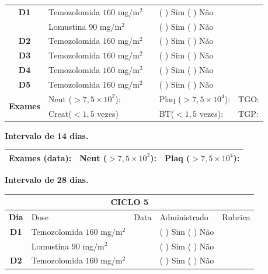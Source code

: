 \documentclass[11pt,a4paper,oldfontcommands]{memoir}
\begin{document}
\begin{center}
\begin{table}[H]
\begin{tabular}{p{1cm}p{5cm}|p{1cm}|p{4.5cm}|p{2cm}}
    \hline
    \multicolumn{1}{c|}{\multirow{1}{*}{\textbf{D1}}}&{Temozolomida \(160\) mg/m\(^2\)}&&{(  ) Sim (  ) Não}&\\
    \multicolumn{1}{c|}{\multirow{1}{*}{\textbf{}}}&{Lomustina \(90\) mg/m\(^2\)}&&{(  ) Sim (  ) Não}&\\
    \multicolumn{1}{c|}{\multirow{1}{*}{\textbf{D2}}}&{Temozolomida \(160\) mg/m\(^2\)}&&{(  ) Sim (  ) Não}&\\
    \multicolumn{1}{c|}{\multirow{1}{*}{\textbf{D3}}}&{Temozolomida \(160\) mg/m\(^2\)}&&{(  ) Sim (  ) Não}&\\
    \multicolumn{1}{c|}{\multirow{1}{*}{\textbf{D4}}}&{Temozolomida \(160\) mg/m\(^2\)}&&{(  ) Sim (  ) Não}&\\
    \multicolumn{1}{c|}{\multirow{1}{*}{\textbf{D5}}}&{Temozolomida \(160\) mg/m\(^2\)}&&{(  ) Sim (  ) Não}&\\
    \hline
    \multicolumn{1}{c|}{\multirow{2}{*}{\textbf{Exames}}}&\multicolumn{2}{l|}{Neut (\(>7,5\times10^2\)):}&{Plaq (\(>7,5\times10^4\)):}&{TGO:}\\
    \cline{2-5}
    \multicolumn{1}{c|}{\multirow{2}{*}{{}}}&\multicolumn{2}{l|}{Creat(\(<1,5\) vezes)}&{BT(\(<1,5\) vezes):}&{TGP:}
    \\
    \hline
\end{tabular}
\end{table}
\textbf{Intervalo de 14 dias.}
\begin{table}[H]
\begin{tabular}{p{5cm}|p{5cm}|p{4.7cm}}
    \hline
    \textbf{Exames (data):}&{Neut (\(>7,5\times10^2\)):}&{Plaq (\(>7,5\times10^4\)):}
    \\
    \hline
\end{tabular}
\end{table}
\textbf{Intervalo de 28 dias.}
\begin{table}[H]
\begin{tabular}{p{1cm}p{5cm}|p{1cm}|p{4.5cm}|p{2cm}}
	\hline
	\multicolumn{5}{c}{\textbf{CICLO 5}}\\
\hline
    \multicolumn{1}{c|}{\multirow{1}{*}{\textbf{Dia}}}&{Dose}&{Data}&{Administrado}&{Rubrica} \\
    \hline
    \multicolumn{1}{c|}{\multirow{1}{*}{\textbf{D1}}}&{Temozolomida \(160\) mg/m\(^2\)}&&{(  ) Sim (  ) Não}&\\
    \multicolumn{1}{c|}{\multirow{1}{*}{\textbf{}}}&{Lomustina \(90\) mg/m\(^2\)}&&{(  ) Sim (  ) Não}&\\
    \multicolumn{1}{c|}{\multirow{1}{*}{\textbf{D2}}}&{Temozolomida \(160\) mg/m\(^2\)}&&{(  ) Sim (  ) Não}&\\

\end{tabular}
\end{table}
\end{center}
\end{document}
